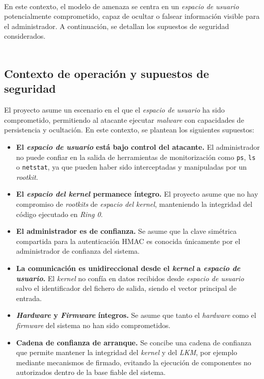 \

En este contexto, el modelo de amenaza se centra en un \textit{espacio de usuario} potencialmente comprometido, capaz de ocultar o falsear información visible para el administrador.
A continuación, se detallan los supuestos de seguridad considerados.\\

\

\subsection{Contexto de operación y supuestos de seguridad}

El proyecto asume un escenario en el que el \textit{espacio de usuario} ha sido comprometido, permitiendo al atacante ejecutar \textit{malware} con capacidades de persistencia y ocultación.
En este contexto, se plantean los siguientes supuestos:

\begin{itemize}
    \item \textbf{El \textit{espacio de usuario} está bajo control del atacante.} El administrador no puede confiar en la salida de herramientas de monitorización como \texttt{ps}, \texttt{ls} o \texttt{netstat}, ya que pueden haber sido interceptadas y manipuladas por un \textit{rootkit}.
    \item \textbf{El \textit{espacio del kernel} permanece íntegro.} El proyecto asume que no hay compromiso de \textit{rootkits} de \textit{espacio del kernel}, manteniendo la integridad del código ejecutado en \textit{Ring 0}.
    \item \textbf{El administrador es de confianza.} Se asume que la clave simétrica compartida para la autenticación HMAC es conocida únicamente por el administrador de confianza del sistema.
    \item \textbf{La comunicación es unidireccional desde el \textit{kernel} a \textit{espacio de usuario}.} El \textit{kernel} no confía en datos recibidos desde \textit{espacio de usuario} salvo el identificador del fichero de salida, siendo el vector principal de entrada.
    \item \textbf{\textit{Hardware} y \textit{Firmware} íntegros.} Se asume que tanto el \textit{hardware} como el \textit{firmware} del sistema no han sido comprometidos.
    \item \textbf{Cadena de confianza de arranque.} Se concibe una cadena de confianza que permite mantener la integridad del \textit{kernel} y del \textit{LKM}, por ejemplo mediante mecanismos de firmado, evitando la ejecución de componentes no autorizados dentro de la base fiable del sistema.
\end{itemize}

